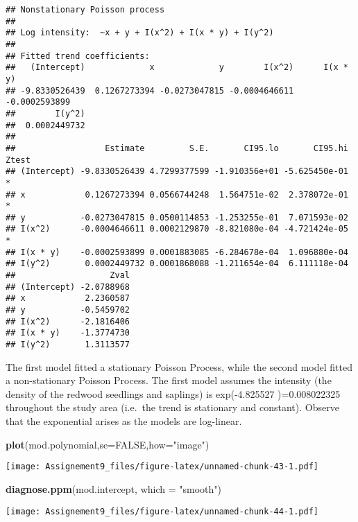 \documentclass[]{article}
\newenvironment{Shaded}{\begin{snugshade}}{\end{snugshade}}
\newcommand{\DataTypeTok}[1]{\textcolor[rgb]{0.13,0.29,0.53}{#1}}
\newcommand{\KeywordTok}[1]{\textcolor[rgb]{0.13,0.29,0.53}{\textbf{#1}}}
\newcommand{\NormalTok}[1]{#1}
\newcommand{\OtherTok}[1]{\textcolor[rgb]{0.56,0.35,0.01}{#1}}
\newcommand{\StringTok}[1]{\textcolor[rgb]{0.31,0.60,0.02}{#1}}
\begin{document}
\begin{verbatim}
## Nonstationary Poisson process
## 
## Log intensity:  ~x + y + I(x^2) + I(x * y) + I(y^2)
## 
## Fitted trend coefficients:
##   (Intercept)             x             y        I(x^2)      I(x * y) 
## -9.8330526439  0.1267273394 -0.0273047815 -0.0004646611 -0.0002593899 
##        I(y^2) 
##  0.0002449732 
## 
##                  Estimate         S.E.       CI95.lo       CI95.hi Ztest
## (Intercept) -9.8330526439 4.7299377599 -1.910356e+01 -5.625450e-01     *
## x            0.1267273394 0.0566744248  1.564751e-02  2.378072e-01     *
## y           -0.0273047815 0.0500114853 -1.253255e-01  7.071593e-02      
## I(x^2)      -0.0004646611 0.0002129870 -8.821080e-04 -4.721424e-05     *
## I(x * y)    -0.0002593899 0.0001883085 -6.284678e-04  1.096880e-04      
## I(y^2)       0.0002449732 0.0001868088 -1.211654e-04  6.111118e-04      
##                   Zval
## (Intercept) -2.0788968
## x            2.2360587
## y           -0.5459702
## I(x^2)      -2.1816406
## I(x * y)    -1.3774730
## I(y^2)       1.3113577
\end{verbatim}

The first model fitted a stationary Poisson Process, while the second
model fitted a non-stationary Poisson Process. The first model assumes
the intensity (the density of the redwood seedlings and saplings) is
exp(-4.825527 )=0.008022325 throughout the study area (i.e.~the trend is
stationary and constant). Observe that the exponential arises as the
models are log-linear.

\begin{Shaded}
\begin{Highlighting}[]
\KeywordTok{plot}\NormalTok{(mod.polynomial,}\DataTypeTok{se=}\OtherTok{FALSE}\NormalTok{,}\DataTypeTok{how=}\StringTok{"image"}\NormalTok{)}
\end{Highlighting}
\end{Shaded}

\texttt{[image: Assignement9\_files/figure-latex/unnamed-chunk-43-1.pdf]}

\begin{Shaded}
\begin{Highlighting}[]
\KeywordTok{diagnose.ppm}\NormalTok{(mod.intercept, }\DataTypeTok{which =} \StringTok{"smooth"}\NormalTok{)}
\end{Highlighting}
\end{Shaded}

\texttt{[image: Assignement9\_files/figure-latex/unnamed-chunk-44-1.pdf]}
\end{document}

